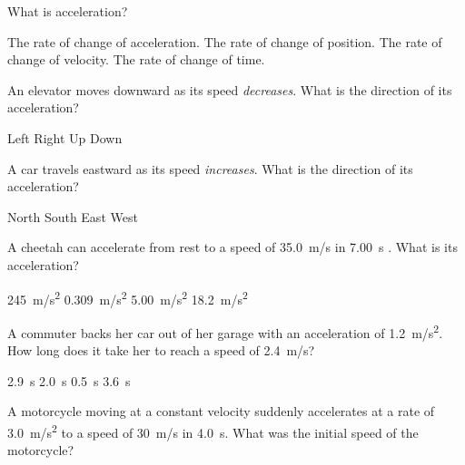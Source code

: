 \documentclass[addpoints]{exam}
\begin{document}
\begin{questions}

\question
What is acceleration?

\begin{choices}
\choice The rate of change of acceleration.
\choice The rate of change of position. 
\CorrectChoice The rate of change of velocity.
\choice The rate of change of time.
\end{choices}

\question %
An elevator moves downward as its speed \textit{decreases}. What is the direction of its acceleration?

\begin{choices}
\choice Left
\choice Right 
\correctchoice Up
\choice Down
\end{choices}

\question %
A car travels eastward as its speed \textit{increases}. What is the direction of its acceleration?

\begin{choices}
\choice North
\choice South 
\correctchoice East
\choice West
\end{choices}


\question %
A cheetah can accelerate from rest to a speed of 
\SI{35.0}{m/s}
in 
\SI{7.00}{s}
. What is its acceleration?

\begin{choices}
\choice \SI{245}{m/s^2}
\choice \SI{0.309}{m/s^2}
\CorrectChoice \SI{5.00}{m/s^2}
\choice \SI{18.2}{m/s^2}
\end{choices}

\question %
A commuter backs her car out of her garage with an acceleration of \SI{1.2}{m/s^2}. How long does it take her to reach a speed of \SI{2.4}{m/s}?

\begin{choices}
\choice \SI{2.9}{s}
\correctchoice \SI{2.0}{s}
\choice \SI{0.5}{s}
\choice \SI{3.6}{s}
\end{choices}



\question %

A motorcycle moving at a constant velocity suddenly accelerates at a rate of \SI{3.0}{m/s^2} to a speed of \SI{30}{m/s} in \SI{4.0}{s}. What was the initial speed of the motorcycle?


\end{questions}
\end{document}
